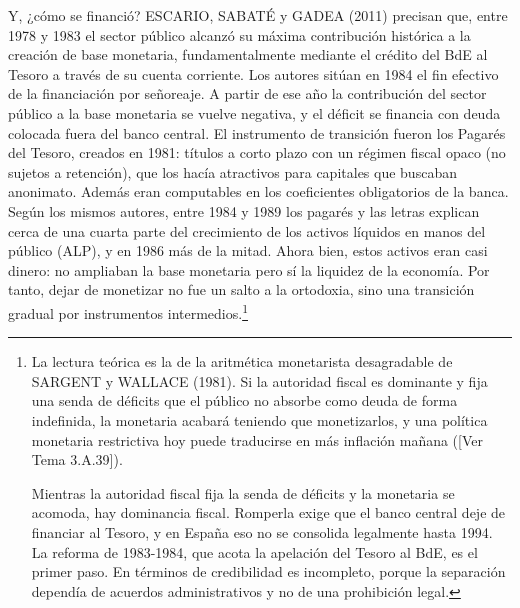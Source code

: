 \documentclass[10pt,a4paper]{article}
\newcommand{\authorfont}[1]{{\fontfamily{EBGaramond-TLF}\selectfont #1}}
\begin{document}
Y, ¿cómo se financió? ESCARIO, SABATÉ y GADEA (2011) precisan que, entre 1978 y 1983 el sector público alcanzó su máxima contribución histórica a la creación de base monetaria, fundamentalmente mediante el crédito del BdE al Tesoro a través de su cuenta corriente. Los autores sitúan en 1984 el fin efectivo de la financiación por señoreaje. A partir de ese año la contribución del sector público a la base monetaria se vuelve negativa, y el déficit se financia con deuda colocada fuera del banco central. El instrumento de transición fueron los Pagarés del Tesoro, creados en 1981: títulos a corto plazo con un régimen fiscal opaco (no sujetos a retención), que los hacía atractivos para capitales que buscaban anonimato. Además eran computables en los coeficientes obligatorios de la banca. Según los mismos autores, entre 1984 y 1989 los pagarés y las letras explican cerca de una cuarta parte del crecimiento de los activos líquidos en manos del público (ALP), y en 1986 más de la mitad. Ahora bien, estos activos eran casi dinero: no ampliaban la base monetaria pero sí la liquidez de la economía. Por tanto, dejar de monetizar no fue un salto a la ortodoxia, sino una transición gradual por instrumentos intermedios.\footnote{La lectura teórica es la de la aritmética monetarista desagradable de SARGENT y WALLACE (1981). Si la autoridad fiscal es dominante y fija una senda de déficits que el público no absorbe como deuda de forma indefinida, la monetaria acabará teniendo que monetizarlos, y una política monetaria restrictiva hoy puede traducirse en más inflación mañana ([\authorfont{Ver Tema 3.A.39}]).

Mientras la autoridad fiscal fija la senda de déficits y la monetaria se acomoda, hay dominancia fiscal. Romperla exige que el banco central deje de financiar al Tesoro, y en España eso no se consolida legalmente hasta 1994. La reforma de 1983-1984, que acota la apelación del Tesoro al BdE, es el primer paso. En términos de credibilidad es incompleto, porque la separación dependía de acuerdos administrativos y no de una prohibición legal.
} 
\end{document}

